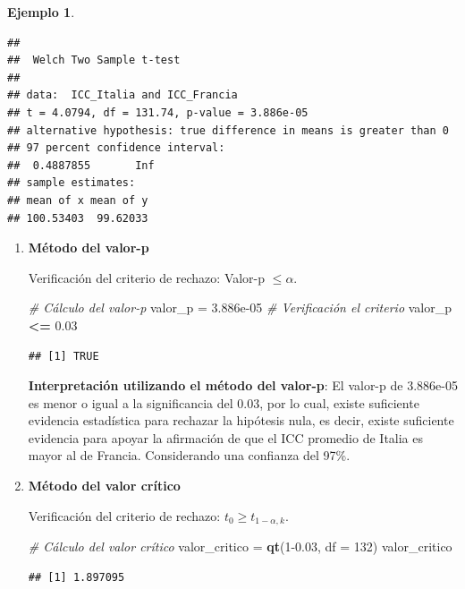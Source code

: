\documentclass[
  11pt,
]{book}
\newenvironment{Shaded}{\begin{snugshade}}{\end{snugshade}}
\newcommand{\AttributeTok}[1]{\textcolor[rgb]{0.13,0.29,0.53}{#1}}
\newcommand{\CommentTok}[1]{\textcolor[rgb]{0.56,0.35,0.01}{\textit{#1}}}
\newcommand{\DecValTok}[1]{\textcolor[rgb]{0.00,0.00,0.81}{#1}}
\newcommand{\FloatTok}[1]{\textcolor[rgb]{0.00,0.00,0.81}{#1}}
\newcommand{\FunctionTok}[1]{\textcolor[rgb]{0.13,0.29,0.53}{\textbf{#1}}}
\newcommand{\NormalTok}[1]{#1}
\newcommand{\OtherTok}[1]{\textcolor[rgb]{0.56,0.35,0.01}{#1}}
\newcommand{\SpecialCharTok}[1]{\textcolor[rgb]{0.81,0.36,0.00}{\textbf{#1}}}
\theoremstyle{definition}
\theoremstyle{definition}
\newtheorem{example}{Ejemplo}[chapter]
\theoremstyle{definition}
\theoremstyle{definition}
\theoremstyle{remark}
\begin{document}
\begin{example}
\begin{verbatim}
## 
##  Welch Two Sample t-test
## 
## data:  ICC_Italia and ICC_Francia
## t = 4.0794, df = 131.74, p-value = 3.886e-05
## alternative hypothesis: true difference in means is greater than 0
## 97 percent confidence interval:
##  0.4887855       Inf
## sample estimates:
## mean of x mean of y 
## 100.53403  99.62033
\end{verbatim}

\begin{enumerate}
\def\labelenumi{\arabic{enumi}.}
\item
  \textbf{Método del valor-p}

  Verificación del criterio de rechazo: Valor-p \(\leq \alpha\).

\begin{Shaded}
\begin{Highlighting}[]
\CommentTok{\# Cálculo del valor{-}p}
\NormalTok{valor\_p }\OtherTok{=} \FloatTok{3.886e{-}05}
\CommentTok{\# Verificación el criterio}
\NormalTok{valor\_p }\SpecialCharTok{\textless{}=} \FloatTok{0.03}
\end{Highlighting}
\end{Shaded}

\begin{verbatim}
## [1] TRUE
\end{verbatim}

  \textbf{Interpretación utilizando el método del valor-p}: El valor-p de 3.886e-05 es menor o igual a la significancia del 0.03, por lo cual, existe suficiente evidencia estadística para rechazar la hipótesis nula, es decir, existe suficiente evidencia para apoyar la afirmación de que el ICC promedio de Italia es mayor al de Francia. Considerando una confianza del 97\%.
\item
  \textbf{Método del valor crítico}

  Verificación del criterio de rechazo: \(t_0 \geq t_{1-\alpha,k}\).

\begin{Shaded}
\begin{Highlighting}[]
\CommentTok{\# Cálculo del valor crítico}
\NormalTok{valor\_critico }\OtherTok{=} \FunctionTok{qt}\NormalTok{(}\DecValTok{1}\FloatTok{{-}0.03}\NormalTok{, }\AttributeTok{df =} \DecValTok{132}\NormalTok{)}
\NormalTok{valor\_critico}
\end{Highlighting}
\end{Shaded}

\begin{verbatim}
## [1] 1.897095
\end{verbatim}


\end{enumerate}
\end{example}
\end{document}
